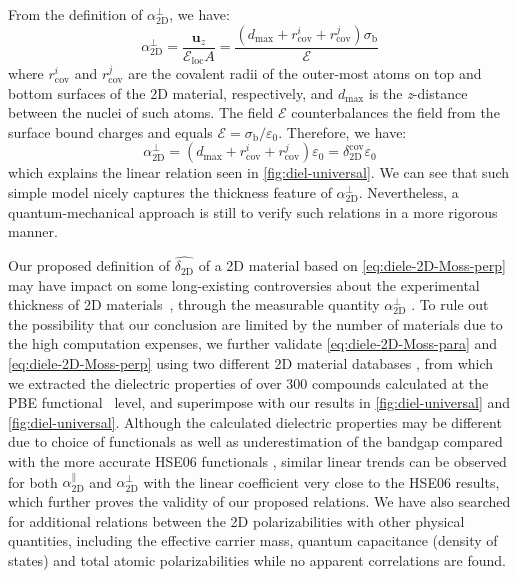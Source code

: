 From the definition of
$\alpha_{\mathrm{2D}}^{\perp}$, we have:
\begin{equation}
  \label{eq:alpha-classic}
  \alpha_{\mathrm{2D}}^{\perp} = \frac{\symbf{u}_{z}}{\mathcal{E}_{\mathrm{loc}} A}
  = \frac{(d_{\mathrm{max}} + r_{\mathrm{cov}}^{i} + r_{\mathrm{cov}}^{j}) \sigma_{\mathrm{b}}}{\mathscr{E}}
\end{equation}
where $r_{\mathrm{cov}}^{i}$ and $r_{\mathrm{cov}}^{j}$ are the
covalent radii of the outer-most atoms on top and bottom surfaces of
the 2D material, respectively, and $d_{\mathrm{max}}$ is the
\textit{z}-distance between the nuclei of such atoms.  The field $\mathcal{E}$
counterbalances the field from the surface bound charges and equals
$\mathcal{E} = \sigma_{\mathrm{b}}/\varepsilon_{0}$. Therefore, we have:
\begin{equation}
  \label{eq:alpha-classic-2}
  \alpha_{\mathrm{2D}}^{\perp} = (d_{\mathrm{max}} + r_{\mathrm{cov}}^{i} + r_{\mathrm{cov}}^{j})\varepsilon_{0}
                = \delta_{\mathrm{2D}}^{\mathrm{cov}} \varepsilon_{0}
\end{equation}
which explains the linear relation seen in
\autoref{fig:diel-universal}. We can see that such simple model
nicely captures the thickness feature of
$\alpha_{\mathrm{2D}}^{\perp}$. Nevertheless, a quantum-mechanical
approach is still to verify such relations in a more rigorous manner.


Our proposed definition of
$\hat{\delta_{\mathrm{2D}}}$ of a 2D material based on
\autoref{eq:diele-2D-Moss-perp} may have impact on some long-existing
controversies about the experimental thickness of 2D
materials~\autocite{Shearer_2016}, through the measurable quantity
$\alpha_{\mathrm{2D}}^{\perp}$
\autocite{Antoine_1999_polariz_C60,Cherniavskaya_2003_nanocryst_polariz,Krauss_1999_EFM}.
% 
%
To rule out the possibility that our conclusion are limited by the
number of materials due to the high computation expenses, we further
validate \autoref{eq:diele-2D-Moss-para} and
\autoref{eq:diele-2D-Moss-perp} using two different 2D material
databases \autocite{Haastrup_2018_database,Mounet_2018_database}, from
which we extracted the dielectric properties of over 300 compounds
calculated at the PBE functional~\autocite{Perdew_1996_GGA} level, and
superimpose with our results in \autoref{fig:diel-universal} and
\autoref{fig:diel-universal}. Although the calculated dielectric
properties may be different due to choice of functionals as well as
underestimation of the bandgap compared with the more accurate HSE06
functionals \autocite{Van_Dyck_2017}, similar linear trends can be
observed for both $\alpha^{\parallel}_{\mathrm{2D}}$ and
$\alpha_{\mathrm{2D}}^{\perp}$ with the linear coefficient very close
to the HSE06 results, which further proves the validity of our
proposed relations. We have also searched for additional relations
between the 2D polarizabilities with other physical quantities,
including the effective carrier mass, quantum capacitance (density of
states) and total atomic polarizabilities while no apparent
correlations are found.

